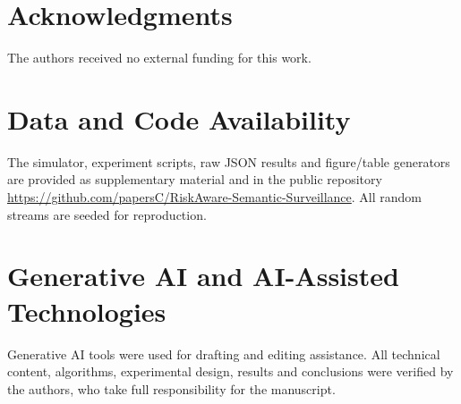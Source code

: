 \documentclass[letterpaper,journal]{IEEEtran}
\begin{document}
\section*{Acknowledgments}
The authors received no external funding for this work.

\section*{Data and Code Availability}
The simulator, experiment scripts, raw JSON results and figure/table generators are provided as supplementary material and in the public repository \url{https://github.com/papersC/RiskAware-Semantic-Surveillance}. All random streams are seeded for reproduction.

\section*{Generative AI and AI-Assisted Technologies}
Generative AI tools were used for drafting and editing assistance. All technical content, algorithms, experimental design, results and conclusions were verified by the authors, who take full responsibility for the manuscript.



\end{document}
